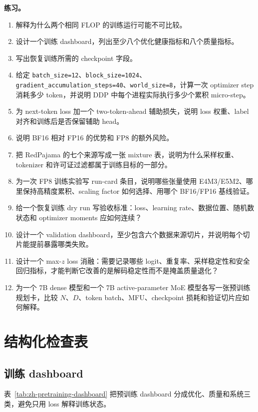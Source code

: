 \documentclass[UTF8,zihao=-4,openany]{ctexbook}
\begin{document}
\textbf{练习。}
\begin{enumerate}
\item 解释为什么两个相同 FLOP 的训练运行可能不可比较。
\item 设计一个训练 dashboard，列出至少八个优化健康指标和八个质量指标。
\item 写出恢复训练所需的 checkpoint 字段。
\item 给定 \texttt{batch\_size=12}、\texttt{block\_size=1024}、\texttt{gradient\_accumulation\_steps=40}、\texttt{world\_size=8}，计算一次 optimizer step 消耗多少 token，并说明 DDP 中每个进程实际执行多少个累积 micro-step。
\item 为 next-token loss 加一个 two-token-ahead 辅助损失，说明 loss 权重、label 对齐和训练后是否保留辅助 head。
\item 说明 BF16 相对 FP16 的优势和 FP8 的额外风险。
\item 把 RedPajama 的七个来源写成一张 mixture 表，说明为什么采样权重、tokenizer 和许可证过滤都属于训练目标的一部分。
\item 为一次 FP8 训练实验写 run-card 条目，说明哪些张量使用 E4M3/E5M2、哪里保持高精度累积、scaling factor 如何选择、用哪个 BF16/FP16 基线验证。
\item 给一个恢复训练 dry run 写验收标准：loss、learning rate、数据位置、随机数状态和 optimizer moments 应如何连续？
\item 设计一个 validation dashboard，至少包含六个数据来源切片，并说明每个切片能提前暴露哪类失败。
\item 设计一个 max-$z$ loss 消融：需要记录哪些 logit、重复率、采样稳定性和安全回归指标，才能判断它改善的是解码稳定性而不是掩盖质量退化？
\item 为一个 7B dense 模型和一个 7B active-parameter MoE 模型各写一张预训练规划卡，比较 $N$、$D$、token batch、MFU、checkpoint 损耗和验证切片应如何解释。
\end{enumerate}

\section{结构化检查表}
\subsection{训练 dashboard}
表~\ref{tab:zh-pretraining-dashboard} 把预训练 dashboard 分成优化、质量和系统三类，避免只用 loss 解释训练状态。
\end{document}
